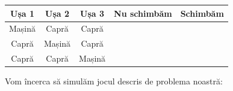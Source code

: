 \documentclass[]{article}
\newcommand{\cmark}{\ding{51}}%
\newcommand{\xmark}{\ding{55}}%
\begin{document}
\begin{center}
\begin{table}[ht]
\centering
  \begin{tabular}{c|c|c|c|c}
  \toprule
    Ușa 1 & Ușa 2 & Ușa 3 & Nu schimbăm & Schimbăm\\
  \midrule
    Mașină & Capră & Capră & \cmark & \xmark\\
    Capră & Mașină & Capră & \xmark & \cmark\\
    Capră & Capră & Mașină & \xmark & \cmark\\
  \bottomrule
    
  \end{tabular}
\end{table}

\end{center}

Vom încerca să simulăm jocul descris de problema noastră:
\end{document}
